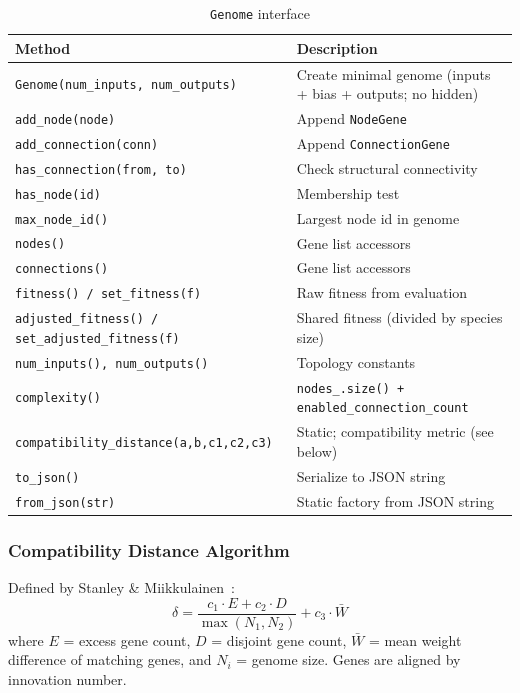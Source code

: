 \begin{table}[H]
\centering\small
\caption{\texttt{Genome} interface}
\begin{tabularx}{\textwidth}{@{}lX@{}}
\toprule
\textbf{Method} & \textbf{Description} \\
\midrule
\texttt{Genome(num\_inputs, num\_outputs)} & Create minimal genome (inputs + bias + outputs; no hidden) \\
\texttt{add\_node(node)} & Append \texttt{NodeGene} \\
\texttt{add\_connection(conn)} & Append \texttt{ConnectionGene} \\
\texttt{has\_connection(from, to)} & Check structural connectivity \\
\texttt{has\_node(id)} & Membership test \\
\texttt{max\_node\_id()} & Largest node id in genome \\
\texttt{nodes()} & Gene list accessors \\
\texttt{connections()} & Gene list accessors \\
\texttt{fitness() / set\_fitness(f)} & Raw fitness from evaluation \\
\texttt{adjusted\_fitness() / set\_adjusted\_fitness(f)} & Shared fitness (divided by species size) \\
\texttt{num\_inputs(), num\_outputs()} & Topology constants \\
\texttt{complexity()} & \texttt{nodes\_.size() + enabled\_connection\_count} \\
\texttt{compatibility\_distance(a,b,c1,c2,c3)} & Static; compatibility metric (see below) \\
\texttt{to\_json()} & Serialize to JSON string \\
\texttt{from\_json(str)} & Static factory from JSON string \\
\bottomrule
\end{tabularx}
\end{table}

\subsubsection{Compatibility Distance Algorithm}

Defined by Stanley \& Miikkulainen~\cite{stanley2002}:
\[
  \delta = \frac{c_1 \cdot E + c_2 \cdot D}{\max(N_1, N_2)} + c_3 \cdot \bar{W}
\]
where $E$ = excess gene count, $D$ = disjoint gene count, $\bar{W}$ = mean weight
difference of matching genes, and $N_i$ = genome size.  Genes are aligned by innovation
number.

